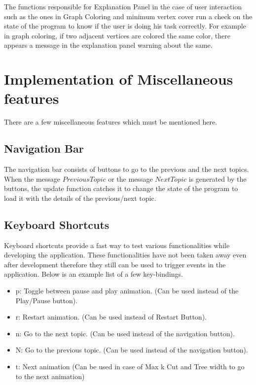 The functions responsible for Explanation Panel in the case of user interaction
such as the ones in Graph Coloring and minimum vertex cover run a check on the
state of the program to know if the user is doing his task correctly. For
example in graph coloring, if two adjacent vertices are colored the same color,
there appears a message in the explanation panel warning about the same.

\section{Implementation of Miscellaneous features}
There are a few miscellaneous features which must be mentioned here.
\subsection{Navigation Bar}
The navigation bar consists of buttons to go to the previous and the next
topics.  When the message $PreviousTopic$ or the message $NextTopic$ is
generated by the buttons, the update function catches it to change the state of
the program to load it with the details of the previous/next topic.
\subsection{Keyboard Shortcuts}
Keyboard shortcuts provide a fast way to test various functionalities while
developing the application.  These functionalities have not been taken away
even after development therefore they still can be used to trigger events in
the application. Below is an example list of a few key-bindings.
\begin{itemize}
\item p: Toggle between pause and play animation. (Can be used instead of the Play/Pause button).
\item r: Restart animation. (Can be used instead of Restart Button).
\item n: Go to the next topic. (Can be used instead of the navigation button).
\item N: Go to the previous topic. (Can be used instead of the navigation button).
\item t: Next animation (Can be used in case of Max k Cut and Tree width to go to the next animation)
\end{itemize}
